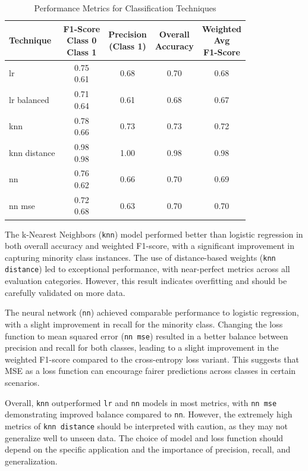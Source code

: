 \begin{table}[H]
	\centering
	\begin{tabular}{|l|c|c|c|c|}
		\hline
		\textbf{Technique} & 
		\makecell{F1-Score \\Class 0\\Class 1} & 
		\makecell{Precision \\ (Class 1)} & 
		\makecell{Overall\\Accuracy} & 
		\makecell{Weighted\\Avg\\F1-Score} \\ \hline
		lr & \makecell { 0.75 \\ 0.61 } & 0.68 & 0.70 & 0.68 \\ \hline
		lr balanced & \makecell { 0.71 \\ 0.64 } & 0.61 & 0.68 & 0.67 \\ \hline
		knn & \makecell { 0.78 \\ 0.66 } & 0.73 & 0.73 & 0.72 \\ \hline
		knn distance & \makecell { 0.98 \\ 0.98 } & 1.00 & 0.98 & 0.98 \\ \hline
		nn & \makecell { 0.76 \\ 0.62 } & 0.66 & 0.70 & 0.69 \\ \hline
		nn mse& \makecell { 0.72 \\ 0.68 } & 0.63 & 0.70 & 0.70 \\ \hline
	\end{tabular}
	\caption{Performance Metrics for Classification Techniques}
	\label{tab:metrics}
\end{table}


The k-Nearest Neighbors (\texttt{knn}) model performed better than logistic regression in both overall accuracy and weighted F1-score, with a significant improvement in capturing minority class instances. The use of distance-based weights (\texttt{knn distance}) led to exceptional performance, with near-perfect metrics across all evaluation categories. However, this result indicates overfitting and should be carefully validated on more data.

The neural network (\texttt{nn}) achieved comparable performance to logistic regression, with a slight improvement in recall for the minority class. Changing the loss function to mean squared error (\texttt{nn mse}) resulted in a better balance between precision and recall for both classes, leading to a slight improvement in the weighted F1-score compared to the cross-entropy loss variant. This suggests that MSE as a loss function can encourage fairer predictions across classes in certain scenarios.

Overall, \texttt{knn} outperformed \texttt{lr} and \texttt{nn} models in most metrics, with \texttt{nn mse} demonstrating improved balance compared to \texttt{nn}. However, the extremely high metrics of \texttt{knn distance} should be interpreted with caution, as they may not generalize well to unseen data. The choice of model and loss function should depend on the specific application and the importance of precision, recall, and generalization.
